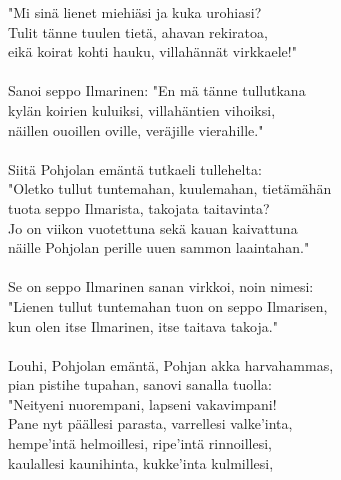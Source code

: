 "Mi sinä lienet miehiäsi ja kuka urohiasi?                        \\
Tulit tänne tuulen tietä, ahavan rekiratoa,                       \\
eikä koirat kohti hauku, villahännät virkkaele!"                  \\
                                                                  \\
Sanoi seppo Ilmarinen: "En mä tänne tullutkana                    \\
kylän koirien kuluiksi, villahäntien vihoiksi,                    \\
näillen ouoillen oville, veräjille vierahille."                   \\
                                                                  \\
Siitä Pohjolan emäntä tutkaeli tullehelta:                        \\
"Oletko tullut tuntemahan, kuulemahan, tietämähän                 \\
tuota seppo Ilmarista, takojata taitavinta?                       \\
Jo on viikon vuotettuna sekä kauan kaivattuna                     \\
näille Pohjolan perille uuen sammon laaintahan."                  \\
                                                                  \\
Se on seppo Ilmarinen sanan virkkoi, noin nimesi:                 \\
"Lienen tullut tuntemahan tuon on seppo Ilmarisen,                \\
kun olen itse Ilmarinen, itse taitava takoja."                    \\
                                                                  \\
Louhi, Pohjolan emäntä, Pohjan akka harvahammas,                  \\
pian pistihe tupahan, sanovi sanalla tuolla:                      \\
"Neityeni nuorempani, lapseni vakavimpani!                        \\
Pane nyt päällesi parasta, varrellesi valke'inta,                 \\
hempe'intä helmoillesi, ripe'intä rinnoillesi,                    \\
kaulallesi kaunihinta, kukke'inta kulmillesi,                     \\

